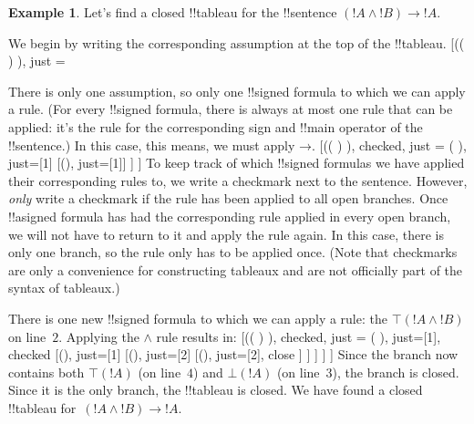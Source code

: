 \documentclass[10pt,a4paper]{article}
\theoremstyle{plain}
\theoremstyle{definition}
\newtheorem{ex}[thm]{Example}
\theoremstyle{remark}
\newenvironment{oltableau}{}{}
\providecommand{\lif}{\mathbin{\rightarrow}}
\providecommand{\sFmla}[2]{#1(#2)}
\providecommand{\formula}{\relax}
\providecommand{\True}{\top}
\providecommand{\False}{\bot}
\providecommand{\TAss}[1]{}
\providecommand{\TRule}[1]{}
\providecommand{\formula}[1]{#1}
\begin{document}
\begin{ex}
Let's find a closed !!{tableau} for the !!{sentence} $(!A \land !B) \lif !A$.

We begin by writing the corresponding assumption at the top of the
!!{tableau}.
\begin{oltableau}
  [\sFmla{\False}{(\formula{A} \land \formula{B}) \lif \formula{A}},
    just = \TAss]
\end{oltableau}

There is only one assumption, so only one !!{signed formula} to which
we can apply a rule. (For every !!{signed formula}, there is always at
most one rule that can be applied: it's the rule for the corresponding
sign and !!{main operator} of the !!{sentence}.) In this case, this
means, we must apply $\TRule{\False}{\lif}$.
\begin{oltableau}
  [\sFmla{\False}{(\formula{A} \land \formula{B}) \lif \formula{A}},
    checked, just = \TAss
    [\sFmla{\True}{\formula{A} \land \formula{B}},
      just={\TRule{\False}{\lif}[1]}
      [\sFmla{\False}{\formula{A}}, just={\TRule{\False}{\lif}[1]}]
    ]
  ]
\end{oltableau}
To keep track of which !!{signed formula}s we have applied their
corresponding rules to, we write a checkmark next to the
sentence. However, \emph{only} write a checkmark if the rule has been
applied to all open branches. Once !!a{signed formula} has had the
corresponding rule applied in every open branch, we will not have to
return to it and apply the rule again. In this case, there is only one
branch, so the rule only has to be applied once. (Note that checkmarks
are only a convenience for constructing tableaux and are not
officially part of the syntax of tableaux.)

There is one new !!{signed formula} to which we can apply a rule: the
$\sFmla{\True}{!A \land !B}$ on line~$2$. Applying the
$\TRule{\True}{\land}$ rule results in:
\begin{oltableau}
  [\sFmla{\False}{(\formula{A} \land \formula{B}) \lif \formula{A}},
    checked, just = \TAss
    [\sFmla{\True}{\formula{A} \land \formula{B}},
      just={\TRule{\False}{\lif}[1]}, checked
      [\sFmla{\False}{\formula{A}}, just={\TRule{\False}{\lif}[1]}
        [\sFmla{\True}{\formula{A}}, just={\TRule{\True}{\land}[2]}
          [\sFmla{\True}{\formula{B}}, just={\TRule{\True}{\land}[2]}, close
          ]
        ]
      ]
    ]
  ]
\end{oltableau}
Since the branch now contains both $\sFmla{\True}{!A}$ (on line~$4$)
and $\sFmla{\False}{!A}$ (on line~$3$), the branch is closed. Since it
is the only branch, the !!{tableau} is closed. We have found
a closed !!{tableau} for~$(!A \land !B) \lif !A$.
\end{ex}
\end{document}
